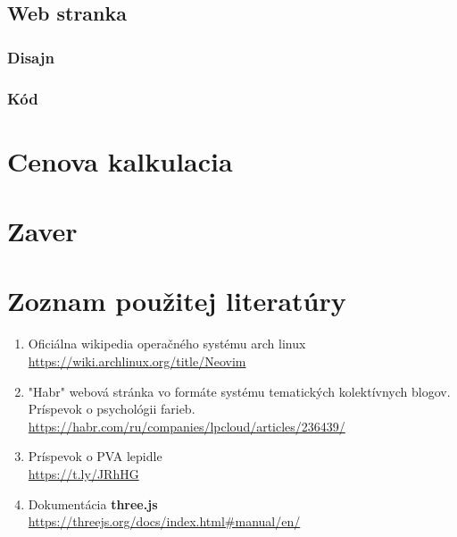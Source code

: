       \subsection{Web stranka}

      \subsubsection{Disajn}

      \subsubsection{Kód}

  \section{Cenova kalkulacia}

  \section{Zaver}

  \section{Zoznam použitej literatúry}

    \begin{enumerate}
      \item{
          Oficiálna wikipedia operačného systému arch linux \\
          \url{https://wiki.archlinux.org/title/Neovim}
      }
      \item{
          "Habr" webová stránka vo formáte systému tematických kolektívnych blogov. Príspevok o psychológii farieb.\\
          \url{https://habr.com/ru/companies/lpcloud/articles/236439/}
      }
      \item{
          Príspevok o PVA lepidle \\
          \url{https://t.ly/JRhHG}
      }
      \item{
          Dokumentácia \textbf{three.js} \\
          \url{https://threejs.org/docs/index.html#manual/en/}
      }
    \end{enumerate}

